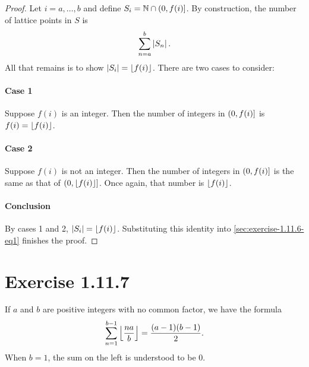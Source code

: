 \documentclass{report}
\begin{document}
\begin{proof}

  Let $i = a, \ldots, b$ and define $S_i = \mathbb{N} \cap \left(0, f(i)\right]$.
  By construction, the number of lattice points in $S$ is
    \begin{equation}
      \label{sec:exercise-1.11.6-eq1}
      \sum_{n = a}^b \left|S_n\right|.
    \end{equation}
  All that remains is to show $\left|S_i\right| = \left\lfloor f(i)\right\rfloor$.
  There are two cases to consider:

  \paragraph{Case 1}%

    Suppose $f(i)$ is an integer.
    Then the number of integers in $\left(0, f(i)\right]$ is $f(i) = \left\lfloor f(i)\right\rfloor$.

  \paragraph{Case 2}%

    Suppose $f(i)$ is not an integer.
    Then the number of integers in $\left(0, f(i)\right]$ is the same as that of
      $\left(0, \left\lfloor f(i)\right\rfloor\right]$.
    Once again, that number is $\left\lfloor f(i)\right\rfloor$.

  \paragraph{Conclusion}%

    By cases 1 and 2, $\left|S_i\right| = \left\lfloor f(i)\right\rfloor$.
    Substituting this identity into \eqref{sec:exercise-1.11.6-eq1} finishes the
      proof.

\end{proof}

\section{Exercise 1.11.7}%
\label{sec:exercise-1.11.7}

If $a$ and $b$ are positive integers with no common factor, we have the formula
  $$\sum_{n=1}^{b-1} \left\lfloor\frac{na}{b}\right\rfloor = \frac{(a - 1)(b - 1)}{2}.$$
When $b = 1$, the sum on the left is understood to be $0$.


\subsection{}%
\label{sub:exercise-1.11.7a}
\end{document}
